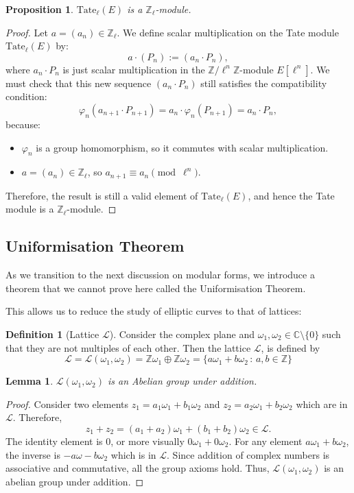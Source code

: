 \documentclass{article}
\newtheorem{lem}[theorem]{Lemma}
\newtheorem{prop}{Proposition}[section]
\theoremstyle{definition}
\newtheorem{definition}{Definition}[section]
\theoremstyle{definition}
\theoremstyle{definition}
\newcommand{\tate}{\operatorname{Tate_{\ell}}}
\newcommand{\C}{\mathbb{C}}
\newcommand{\Z}{\mathbb{Z}}
\begin{document}
\begin{prop}$\tate(E)$ is a $\Z_\ell$-module.  
\end{prop}

\begin{proof}
    Let \( a = (a_n) \in \mathbb{Z}_\ell  \). We define scalar multiplication on the Tate module $\tate(E)$ by:
\[
a \cdot (P_n) := (a_n \cdot P_n),
\]
where \( a_n \cdot P_n \) is just scalar multiplication in the \( \mathbb{Z}/\ell^n\mathbb{Z} \)-module \( E[\ell^n] \).
\newline\newline
We must check that this new sequence \( (a_n \cdot P_n) \) still satisfies the compatibility condition:
\[
\varphi_n(a_{n+1} \cdot P_{n+1}) = a_n \cdot \varphi_n(P_{n+1}) = a_n \cdot P_n,
\]
because:
\begin{itemize}
    \item \( \varphi_n \) is a group homomorphism, so it commutes with scalar multiplication. 
    
    \item  \( a = (a_n) \in \mathbb{Z}_\ell \), so \( a_{n+1} \equiv a_n \pmod{\ell^n} \).
\end{itemize}

Therefore, the result is still a valid element of $\tate(E)$, and hence the Tate module is a $\Z_\ell$-module.

\end{proof}

\subsection{Uniformisation Theorem}

As we transition to the next discussion on modular forms, we introduce a theorem that we cannot prove here called the Uniformisation Theorem.

This allows us to reduce the study of elliptic curves to that of lattices:

\begin{definition}[Lattice $\mathcal{L}$]
   Consider the complex plane and $\omega_1,\omega_2\in\C\setminus\{0\}$ such that they are not multiples of each other. Then the lattice $\mathcal{L}$, is defined by
   $$\mathcal{L}=\mathcal{L}(\omega_1,\omega_2)=\Z\omega_1\oplus\Z\omega_2=\{a\omega_1+b\omega_2\,:\,a,b\in\Z\}$$
\end{definition}
\begin{lem}
    $\mathcal{L}(\omega_1,\omega_2)$ is an Abelian group under addition.
\end{lem}
\begin{proof}
    Consider two elements $z_1=a_1\omega_1+b_1\omega_2$ and $z_2=a_2\omega_1+b_2\omega_2$ which are in $\mathcal{L}$. Therefore, $$z_1+z_2=(a_1+a_2)\omega_1+(b_1+b_2)\omega_2 \in \mathcal{L}.$$ The identity element is $0$, or more visually $0\omega_1+0\omega_2$. For any element $a\omega_1+b\omega_2$, the inverse is $-a\omega-b\omega_2$ which is in $\mathcal{L}$. Since addition of complex numbers is associative and commutative, all the group axioms hold. Thus, $\mathcal{L}(\omega_1,\omega_2)$ is an abelian group under addition.


\end{proof}
\end{document}
